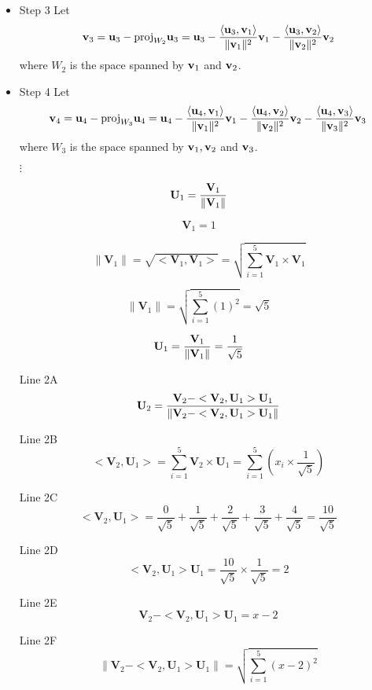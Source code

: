 \documentclass[12pt, a4paper]{report}
\theoremstyle{plain}
\theoremstyle{definition}
\theoremstyle{remark}
\begin{document}
{{\begin{itemize}
\item Step 3 Let \[ {\bf v}_3 = {\bf u}_3 -
		\mbox{proj}_{W_{2}} {\bf u}_3 = {\bf u}_3- \frac{\langle
		{\bf u}_3,{\bf v}_1\rangle}{\| {\bf v}_1 \|^{2}}{\bf v}_1 - \frac{\langle
		{\bf u}_3,{\bf v}_2\rangle}{\| {\bf v}_2 \|^{2}}{\bf v}_2 \] where $W_2$ is
		the space spanned by ${\bf v}_1$ and ${\bf v}_2$.		
		
\item Step 4 Let \[{\bf v}_4 = {\bf u}_4 -
		\mbox{proj}_{W_{3}} {\bf u}_4 = {\bf u}_4- \frac{\langle
		{\bf u}_4,{\bf v}_1\rangle}{\| {\bf v}_1 \|^{2}}{\bf v}_1 - \frac{\langle
		{\bf u}_4,{\bf v}_2\rangle}{\| {\bf v}_2 \|^{2}}{\bf v}_2 - \frac{\langle
		{\bf u}_4,{\bf v}_3\rangle}{\| {\bf v}_3 \|^{2}}{\bf v}_3\] where $W_3$ is
		the space spanned by ${\bf v}_1, {\bf v}_2$ and ${\bf v}_3$.

 $\vdots$
\end{itemize}

}

\newpage
{
\Large

\[ \mathbf{U}_1  = {\mathbf{V}_1 \over \|\mathbf{V}_1\|} \]

\[\mathbf{V}_1 = 1\]

 \[\|\mathbf{V}_1\| = \sqrt{<\mathbf{V}_1,\mathbf{V}_1>} = \sqrt{\sum_{i=1}^{5} \mathbf{V}_1 \times \mathbf{V}_1}\]

 \[\|\mathbf{V}_1\|  = \sqrt{\sum_{i=1}^{5} (1)^2} = \sqrt{5}\]

 \[ \mathbf{U}_1  = {\mathbf{V}_1 \over \|\mathbf{V}_1\|} = \frac{1}{\sqrt{5}} \]
\newpage

\begin{itemize}
\item[Line 2A]
\[ \mathbf{U}_2  = {\mathbf{V}_2 - <\mathbf{V}_2,\mathbf{U}_1>\mathbf{U}_1 \over \|\mathbf{V}_2 - <\mathbf{V}_2,\mathbf{U}_1>\mathbf{U}_1\|} \]
\item[Line 2B]
\[ <\mathbf{V}_2,\mathbf{U}_1> = \sum_{i=1}^{5}  \mathbf{V}_2 \times \mathbf{U}_1 = \sum_{i=1}^{5} \left(x_i \times \frac{1}{\sqrt{5}} \right) \]

\item[Line 2C]
\[ <\mathbf{V}_2,\mathbf{U}_1> =  \frac{0}{\sqrt{5}} + \frac{1}{\sqrt{5}} +\frac{2}{\sqrt{5}}+\frac{3}{\sqrt{5}}+\frac{4}{\sqrt{5}} = \frac{10}{\sqrt{5}} \]
\item[Line 2D]
\[ <\mathbf{V}_2,\mathbf{U}_1>\mathbf{U}_1 =    \frac{10}{\sqrt{5}} \times \frac{1}{\sqrt{5}} = 2\]
\item[Line 2E]
\[ \mathbf{V}_2 - <\mathbf{V}_2,\mathbf{U}_1>\mathbf{U}_1  =x - 2\]
\item[Line 2F]
\[ \|  \mathbf{V}_2 - <\mathbf{V}_2,\mathbf{U}_1>\mathbf{U}_1 \| = \sqrt{\sum_{i=1}^{5} (x-2)^2}  \]


\end{itemize}}}
\end{document}
